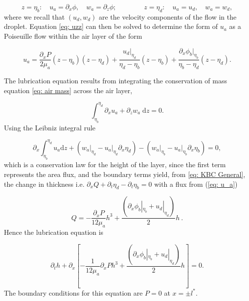 \begin{equation*}
    z=\eta_b: \quad u_a = \partial_x \phi, \quad w_a  =\partial_z \phi;  \qquad  \qquad z=\eta_d: \quad
    u_a = u_d, \quad w_a = w_d,
\end{equation*}
where we recall that $(u_d,w_d)$ are the velocity components of the flow in the droplet. Equation \eqref{eq: uzz} can then be solved to determine the form of $u_a$ as a Poiseuille flow within the air layer of the form 

\begin{equation}\label{eq: u_a}
    u_a = \frac{\partial_x P}{2\mu_a}(z-\eta_b)(z-\eta_d) + \frac{u_d|_{\eta_d}}{\eta_d- \eta_b}(z-\eta_b) + \frac{\partial_x \phi_b|_{\eta_b}}{\eta_b- \eta_d}(z-\eta_d).
\end{equation}

The lubrication equation results from integrating the conservation of mass equation \eqref{eq: air mass} across the air layer, 

\begin{equation}
    \int_{\eta_b}^{\eta_d} \partial_x u_a + \partial_z w_a \; \text{d}z = 0.
\end{equation}
Using the Leibniz integral rule 

\begin{equation}
    \partial_x \int_{\eta_b}^{\eta_d} u_a \text{d}z + \left(w_a\Big|_{\eta_d} - u_a \Big|_{\eta_d}\partial_x \eta_d\right)  - \left(w_a\Big|_{\eta_b} - u_a \Big|_{\eta_b} \partial_x \eta_b \right) = 0,
\end{equation}
which is a conservation law for the height of the layer, since the first term represents the area flux, and the boundary terms yield, from \eqref{eq: KBC General}, the change in thickness i.e. $\partial_x Q + \partial_t \eta_d  - \partial_t \eta_b = 0$ with a flux from (\ref{eq: u_a})

\begin{equation}
Q = -\frac{\partial_x P}{12\mu_a} h^3 + \frac{(\partial_x \phi_b|_{\eta_b} + u_d|_{\eta_d})}{2} h~.
\end{equation}
Hence the lubrication equation is

\begin{equation}\label{eq: thin film}
\partial_t h +  \partial_x \left[-\frac{1}{12\mu_a} \partial_x P h^3 + \frac{(\partial_x \phi_b|_{\eta_b} + u_d|_{\eta_d} )}{2} h \right] = 0.
\end{equation}
The boundary conditions for this equation are 
$P=0$ at $x=\pm l^*$.